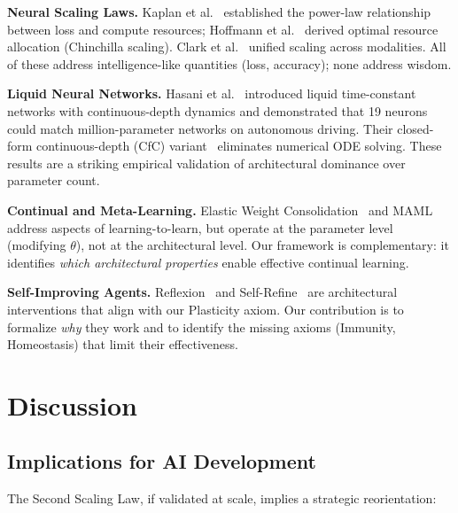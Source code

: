 \documentclass{article}
\begin{document}
\textbf{Neural Scaling Laws.}
Kaplan et al.~\citep{kaplan2020scaling} established the power-law relationship between loss and compute resources; Hoffmann et al.~\citep{hoffmann2022training} derived optimal resource allocation (Chinchilla scaling).
Clark et al.~\citep{clark2022unified} unified scaling across modalities.
All of these address intelligence-like quantities (loss, accuracy); none address wisdom.

\textbf{Liquid Neural Networks.}
Hasani et al.~\citep{hasani2021liquid} introduced liquid time-constant networks with continuous-depth dynamics and demonstrated that 19 neurons could match million-parameter networks on autonomous driving.
Their closed-form continuous-depth (CfC) variant~\citep{hasani2022liquid} eliminates numerical ODE solving.
These results are a striking empirical validation of architectural dominance over parameter count.

\textbf{Continual and Meta-Learning.}
Elastic Weight Consolidation~\citep{kirkpatrick2017overcoming} and MAML~\citep{finn2017model} address aspects of learning-to-learn, but operate at the parameter level (modifying $\theta$), not at the architectural level.
Our framework is complementary: it identifies \emph{which architectural properties} enable effective continual learning.

\textbf{Self-Improving Agents.}
Reflexion~\citep{shinn2023reflexion} and Self-Refine~\citep{madaan2023selfrefine} are architectural interventions that align with our Plasticity axiom.
Our contribution is to formalize \emph{why} they work and to identify the missing axioms (Immunity, Homeostasis) that limit their effectiveness.

\section{Discussion}
\label{sec:discussion}

\subsection{Implications for AI Development}

The Second Scaling Law, if validated at scale, implies a strategic reorientation:
\end{document}
